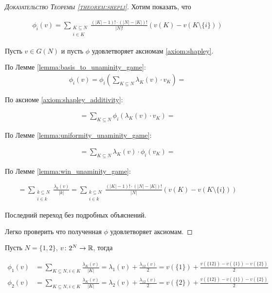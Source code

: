 \documentclass[../main.tex]{subfiles}
\begin{document}
\begin{proof}[\normalfont\textsc{Доказательство Теоремы \ref{theorem:shepli}}]
	Хотим показать, что 

	\begin{align*}
		\phi_i(v) = \sum_{\substack{K \subseteq N \\ i \in K}} \frac{(|K| - 1)! \cdot (|N| - |K|)!}{|N|!} (v(K) - v(K \setminus \{i\}))
	\end{align*}

	Пусть $v \in G(N)$ и пусть  $\phi$ удовлетворяет аксиомам \ref{axiom:shapley}.

	По Лемме \ref{lemma:basis_to_unaminity_game}:
	 \begin{align*}
		 \phi_i(v) = \phi_i \left(\sum_{K \subseteq N} \lambda_K (v) \cdot v_K\right) =
	\end{align*}

	По аксиоме \eqref{axiom:shapley_additivity}:

	\begin{align*}
		= \sum_{K \subseteq N} \phi_i(\lambda_K(v) \cdot v_K) =
	\end{align*}

	По Лемме \ref{lemma:uniformity_unaminity_game}:

	\begin{align*}
		= \sum_{K \subseteq N} \lambda_K(v) \cdot \phi_i(v_K) =
	\end{align*}

	По Лемме \ref{lemma:win_unaminity_game}:

	\begin{align*}
		= \sum_{\substack{k \subseteq N \\ i \in k}} \frac{\lambda_k(v)}{|k|} = \sum_{\substack{k \subseteq N \\ i \in k}} \frac{(|K| - 1)! \cdot (|N| - |K|)!}{|N|} (v(K) - v(K \setminus \{i\}))
	\end{align*}

	Последний переход без подробных объяснений.

	Легко проверить что полученная $\phi$ удовлетворяет аксиомам.

\end{proof}

\begin{exmpl}
	Пусть $N = \{1, 2\}$,  $v \colon 2^{N} \to \mathbb{R}$, тогда

	\begin{align*}
		\phi_1(v) &= \sum_{K \subseteq N, i \in K} \frac{\lambda_K(v)}{|K|} = \lambda_1(v) + \frac{\lambda_{12}(v)}{2} = v(\{1\}) + \frac{v(\{12\}) - v(\{1\}) - v(\{2\})}{2} \\
		\phi_2(v) &=  \sum_{K \subseteq N, i \in K} \frac{\lambda_K(v)}{|K|} = \lambda_2(v) + \frac{\lambda_{12}(v)}{2} = v(\{2\}) + \frac{v(\{12\}) - v(\{1\}) - v(\{2\})}{2}
	\end{align*}
\end{exmpl}
\end{document}
